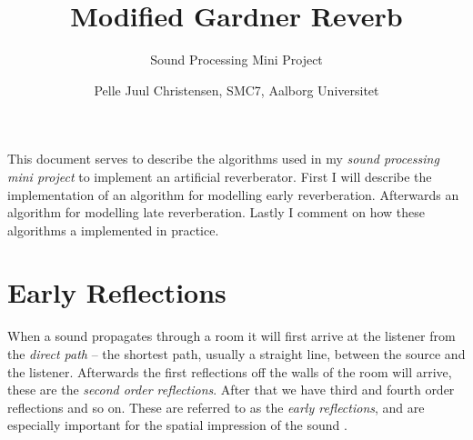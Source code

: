 \documentclass{scrartcl}
\title{Modified Gardner Reverb}
\subtitle{Sound Processing Mini Project}
\author{Pelle Juul Christensen, SMC7, Aalborg Universitet}
\begin{document}
\maketitle

This document serves to describe the algorithms used in my \textit{sound processing mini project} to implement an artificial reverberator. First I will describe the implementation of an algorithm for modelling early reverberation. Afterwards an algorithm for modelling late reverberation. Lastly I comment on how these algorithms a implemented in practice.

\section{Early Reflections}
When a sound propagates through a room it will first arrive at the listener from the \textit{direct path} -- the shortest path, usually a straight line, between the source and the listener. Afterwards the first reflections off the walls of the room will arrive, these are the \textit{second order reflections}. After that we have third and fourth order reflections and so on. These are referred to as the \textit{early reflections}, and are especially important for the spatial impression of the sound \cite[pp. 100]{gardner2002}.

\end{document}
